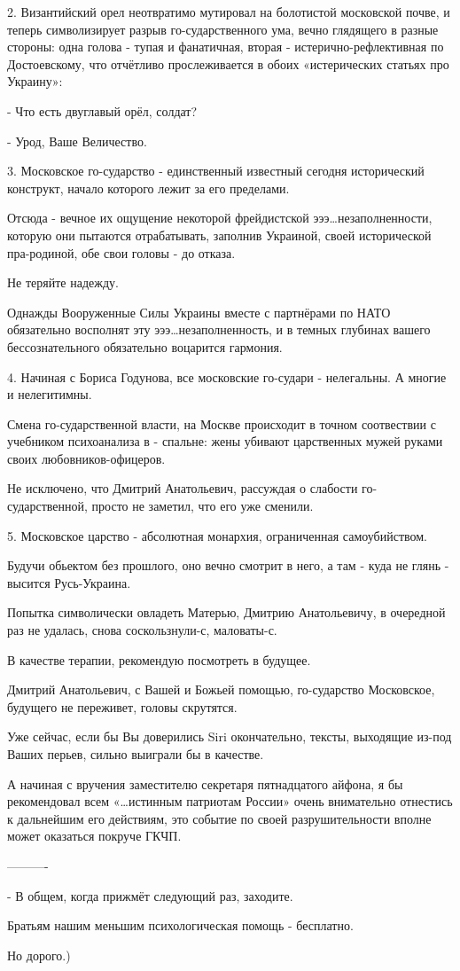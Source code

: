 2. Византийский орел неотвратимо мутировал на болотистой московской почве, и
теперь символизирует разрыв го-сударственного ума, вечно глядящего в разные
стороны: одна голова - тупая и фанатичная, вторая - истерично-рефлективная по
Достоевскому, что отчётливо прослеживается в обоих «истерических статьях про
Украину»:

- Что есть двуглавый орёл, солдат? 

- Урод, Ваше Величество.

3. Московское го-сударство - единственный известный сегодня исторический
конструкт, начало которого лежит за его пределами.

Отсюда - вечное их ощущение некоторой фрейдистской эээ…незаполненности, которую
они пытаются отрабатывать, заполнив Украиной, своей исторической пра-родиной,
обе свои головы - до отказа. 

Не теряйте надежду. 

Однажды Вооруженные Силы Украины вместе с партнёрами по НАТО обязательно
восполнят эту эээ…незаполненность, и в темных глубинах вашего бессознательного
обязательно воцарится гармония.

4. Начиная с Бориса Годунова, все московские го-судари - нелегальны. А многие и
нелегитимны.

Смена го-сударственной власти, на Москве происходит в точном соотвествии с
учебником психоанализа в - спальне: жены убивают царственных мужей руками своих
любовников-офицеров.

Не исключено, что Дмитрий Анатольевич, рассуждая о слабости го-сударственной,
просто не заметил, что его уже сменили.

5. Московское царство - абсолютная монархия, ограниченная самоубийством. 

Будучи обьектом без прошлого, оно вечно смотрит в него, а там - куда не глянь -
высится Русь-Украина. 

Попытка символически овладеть Матерью, Дмитрию Анатольевичу, в очередной раз не
удалась, снова соскользнули-с, маловаты-с. 

В качестве терапии, рекомендую посмотреть в будущее.

Дмитрий Анатольевич, с Вашей и Божьей помощью, го-сударство Московское,
будущего не переживет, головы скрутятся.

Уже сейчас, если бы Вы доверились Siri окончательно, тексты, выходящие из-под
Ваших перьев, сильно выиграли бы в качестве. 

А начиная с вручения заместителю секретаря пятнадцатого айфона, я бы
рекомендовал всем «…истинным патриотам России» очень внимательно отнестись к
дальнейшим его действиям, это событие по своей разрушительности вполне может
оказаться покруче ГКЧП.

———-

- В общем, когда прижмёт следующий раз, заходите. 

Братьям нашим меньшим психологическая помощь - бесплатно.

Но дорого.)
